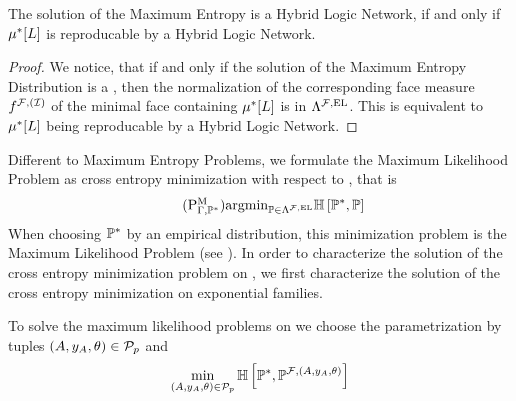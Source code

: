 \begin{theorem}
    The solution of the Maximum Entropy  is a Hybrid Logic Network, if and only if $\mu^*[L]$ is reproducable by a Hybrid Logic Network.
\end{theorem}
%
%
%
\begin{proof}
    We notice, that if and only if the solution of the Maximum Entropy Distribution is a \HybridLogicNetwork{}, then the normalization of the corresponding face measure $f^{\mathcal{F},(\mathcal{I})}$ of the minimal face containing $\mu^*[L]$ is in $\Lambda^{\mathcal{F},\mathrm{EL}}$.
    This is equivalent to $\mu^*[L]$ being reproducable by a Hybrid Logic Network.
\end{proof}



Different to Maximum Entropy Problems, we formulate the Maximum Likelihood Problem as cross entropy minimization with respect to \HybridLogicNetworks{}, that is
\begin{align}
    \label{prob:minCrossEntropyHLN}\tag{$\probtagtypeinst{\mathrm{M}}{\Gamma,\gendistribution}$}
    \argmin_{\probtensor\in\elrealizabledistsof{\mlnstat}} \centropyof{\gendistribution}{\probtensor}
\end{align}
When choosing $\mathbb{P}^*$ by an empirical distribution, this minimization problem is the Maximum Likelihood Problem (see ).
In order to characterize the solution of the cross entropy minimization problem on \HybridLogicNetworks{}, we first characterize the solution of the cross entropy minimization on exponential families.


To solve the maximum likelihood problems on \HybridLogicNetworks{} we choose the parametrization by tuples $(A,y_{A},\theta)\in\mathcal{P}_{p}$ and
\begin{align*}
    \min_{(A,y_{A},\theta)\in\mathcal{P}_{p}} \mathbb{H}\left[\mathbb{P}^*,\mathbb{P}^{\mathcal{F},(A,y_{A},\theta)}\right]
\end{align*}



